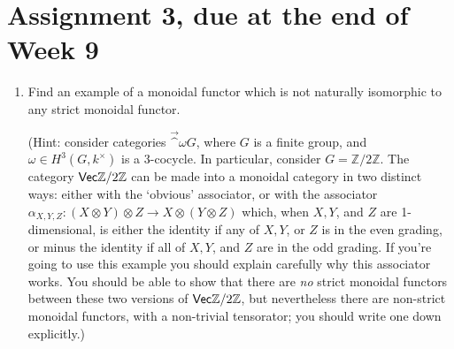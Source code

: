 \documentclass[12pt]{amsart}
\begin{document}
\section{Assignment 3, due at the end of Week 9}
\begin{enumerate}


\item Find an example of a monoidal functor which is not naturally isomorphic to any strict monoidal functor.

(Hint: consider categories $\Vec^\omega G$, where $G$ is a finite group, and $\omega \in H^3(G, k^\times)$ is a 3-cocycle. In particular, consider $G = \mathbb Z / 2 \mathbb Z$. The category $\Vec \mathbb Z / 2 \mathbb Z$ can be made into a monoidal category in two
distinct ways: either with the `obvious' associator, or with the associator $\alpha_{X, Y, Z} : (X \otimes Y) \otimes Z \to X \otimes (Y \otimes Z)$ which, when $X, Y$, and $Z$ are 1-dimensional, is either the identity if any of $X, Y$, or $Z$ is in the even grading, or minus the identity if all  of $X, Y$, and $Z$ are in the odd grading. If you're going to use this example you should explain carefully why this associator works. You should be able to show that there are \emph{no} strict monoidal functors between these two versions of $\Vec \mathbb Z / 2 \mathbb Z$, but nevertheless there are non-strict monoidal functors, with a non-trivial tensorator; you should write one down explicitly.)


\end{enumerate}
\end{document}
